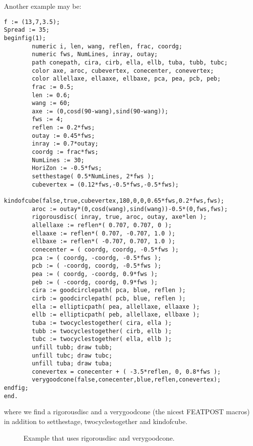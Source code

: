 \documentclass[a4paper]{article}
\newif\ifpdf
\begin{document}
Another example may be:
\begin{tscreen}
\begin{verbatim}
f := (13,7,3.5);
Spread := 35;
beginfig(1);
        numeric i, len, wang, reflen, frac, coordg;
        numeric fws, NumLines, inray, outay;
        path conepath, cira, cirb, ella, ellb, tuba, tubb, tubc;
        color axe, aroc, cubevertex, conecenter, conevertex;    
        color allellaxe, ellaaxe, ellbaxe, pca, pea, pcb, peb;
        frac := 0.5;
        len := 0.6;
        wang := 60;
        axe := (0,cosd(90-wang),sind(90-wang));
        fws := 4;
        reflen := 0.2*fws;
        outay := 0.45*fws;
        inray := 0.7*outay;
        coordg := frac*fws;
        NumLines := 30;
        HoriZon := -0.5*fws;
        setthestage( 0.5*NumLines, 2*fws );
        cubevertex = (0.12*fws,-0.5*fws,-0.5*fws);
        kindofcube(false,true,cubevertex,180,0,0,0.65*fws,0.2*fws,fws);
        aroc := outay*(0,cosd(wang),sind(wang))-0.5*(0,fws,fws);
        rigorousdisc( inray, true, aroc, outay, axe*len );
        allellaxe := reflen*( 0.707, 0.707, 0 );
        ellaaxe := reflen*( 0.707, -0.707, 1.0 );
        ellbaxe := reflen*( -0.707, 0.707, 1.0 );
        conecenter = ( coordg, coordg, -0.5*fws );
        pca := ( coordg, -coordg, -0.5*fws );
        pcb := ( -coordg, coordg, -0.5*fws );
        pea := ( coordg, -coordg, 0.9*fws );
        peb := ( -coordg, coordg, 0.9*fws );
        cira := goodcirclepath( pca, blue, reflen );
        cirb := goodcirclepath( pcb, blue, reflen );
        ella := ellipticpath( pea, allellaxe, ellaaxe );
        ellb := ellipticpath( peb, allellaxe, ellbaxe );
        tuba := twocyclestogether( cira, ella );
        tubb := twocyclestogether( cirb, ellb );
        tubc := twocyclestogether( ella, ellb );
        unfill tubb; draw tubb;
        unfill tubc; draw tubc;
        unfill tuba; draw tuba;
        conevertex = conecenter + ( -3.5*reflen, 0, 0.8*fws );
        verygoodcone(false,conecenter,blue,reflen,conevertex);
endfig;
end.
\end{verbatim}
\end{tscreen}
where we find a {\ttfamily rigorousdisc} 
and a {\ttfamily verygoodcone}
(the nicest {\ttfamily FEATPOST} macros) in addition to 
{\ttfamily setthestage}, {\ttfamily twocyclestogether} and 
{\ttfamily kindofcube}.

\begin{figure}[tbp]
\ifpdf

\else
\centerline{}\fi
\ifpdf
\centerline{\epsfig{file=../nontextualpng/stageforthree.1.png}}\fi
\caption{Example that uses {\ttfamily rigorousdisc} and               {\ttfamily verygoodcone}.}
\end{figure}
\label{figstageforthree}
\end{document}
